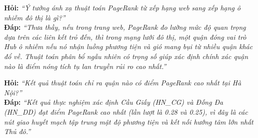 \documentclass[11pt,a4paper]{article}
\begin{document}
\begin{tcolorbox}[colback=blue!5!white, colframe=blue!60!black, fonttitle=\bfseries\color{white}, title={BỘ CÂU HỎI VẤN ĐÁP TRỌNG TÂM DÀNH CHO TV 5}]
\textbf{Hỏi:} \textit{“Ý tưởng ánh xạ thuật toán PageRank từ xếp hạng web sang xếp hạng ô nhiễm đô thị là gì?”}\\
\textbf{Đáp:} \textit{“Thưa thầy, nếu trong trang web, PageRank đo lường mức độ quan trọng dựa trên các liên kết trỏ đến, thì trong mạng lưới đô thị, một quận đóng vai trò Hub ô nhiễm nếu nó nhận luồng phương tiện và gió mang bụi từ nhiều quận khác đổ về. Thuật toán phân bổ ngẫu nhiên có trọng số giúp xác định chính xác quận nào là điểm nóng tích tụ lan truyền rủi ro cao nhất.”}

\textbf{Hỏi:} \textit{“Kết quả thuật toán chỉ ra quận nào có điểm PageRank cao nhất tại Hà Nội?”}\\
\textbf{Đáp:} \textit{“Kết quả thực nghiệm xác định Cầu Giấy (HN\_CG) và Đống Đa (HN\_DD) đạt điểm PageRank cao nhất (lần lượt là 0.28 và 0.25), vì đây là các nút giao huyết mạch tập trung mật độ phương tiện và kết nối hướng tâm lớn nhất Thủ đô.”}
\end{tcolorbox}

\end{document}
